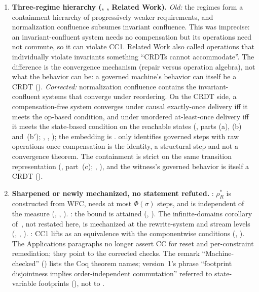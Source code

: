 \documentclass[11pt,a4paper]{article}
\theoremstyle{plain}
\theoremstyle{definition}
\theoremstyle{remark}
\renewcommand{\_}{\textunderscore\allowbreak}
\begin{document}
\begin{enumerate}[leftmargin=*,label=\textbf{E\arabic*.},ref=E\arabic*]
\item \textbf{Three-regime hierarchy (,
  , Related Work).}
  \emph{Old:} the regimes form a containment hierarchy of progressively
  weaker requirements, and normalization confluence subsumes invariant
  confluence.  This was imprecise: an invariant-confluent system needs no
  compensation but its operations need not commute, so it can violate CC1.
  Related Work also called operations that individually violate invariants
  something ``CRDTs cannot accommodate''.  The difference is the convergence
  mechanism (repair versus operation algebra), not what the behavior can be:
  a governed machine's behavior can itself be a CRDT
  ().
  \emph{Corrected:} normalization confluence contains the
  invariant-confluent systems that converge under reordering.  On the CRDT
  side, a compensation-free system converges under causal exactly-once
  delivery iff it meets the op-based condition, and under unordered
  at-least-once delivery iff it meets the state-based condition on the
  reachable states (, parts (a), (b) and~(b$'$);
  , ,
  ); the embedding is .
   only identifies governed steps with raw
  operations once compensation is the identity, a structural step and not a
  convergence theorem.  The containment is strict on the same transition
  representation (, part~(c); ,
  ), and the witness's governed behavior is itself a
  CRDT ().

\item \textbf{Sharpened or newly mechanized, no statement refuted.}
  : $\rho_R^*$ is constructed from WFC, needs at most
  $\Phi(\sigma)$ steps, and is independent of the measure
  (, ,
  ).  : the bound is attained
  (, ).
  The infinite-domains corollary of~\cite{blackwell2026nc}, not restated
  here, is mechanized at the rewrite-system and stream levels
  (, ,
  ).  : CC1 lifts
  as an equivalence with the componentwise conditions
  (, ).  The
  Applications paragraphs no longer assert CC for reset and per-constraint
  remediation; they point to the corrected checks.  The remark
  ``Machine-checked'' () lists the Coq theorem
  names; version~1's phrase ``footprint disjointness implies
  order-independent commutation'' referred to state-variable footprints
  (), not to .
\end{enumerate}
\end{document}
